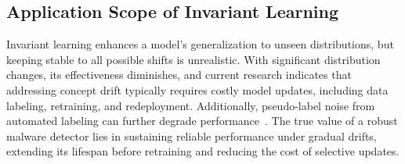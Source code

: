 \subsection{Application Scope of Invariant Learning}
Invariant learning enhances a model’s generalization to unseen distributions, but keeping stable to all possible shifts is unrealistic. With significant distribution changes, its effectiveness diminishes, and current research indicates that addressing concept drift typically requires costly model updates, including data labeling, retraining, and redeployment. Additionally, pseudo-label noise from automated labeling can further degrade performance~\cite{labelless}. The true value of a robust malware detector lies in sustaining reliable performance under gradual drifts, extending its lifespan before retraining and reducing the cost of selective updates.
